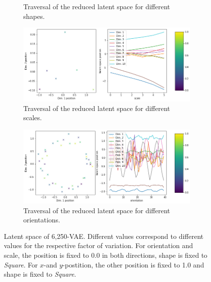 \begin{figure}[H]
\begin{subfigure}{.48\textwidth}
        \caption{Traversal of the reduced latent space for different shapes.}
    \end{subfigure}
    \begin{subfigure}{.48\textwidth}
        \includegraphics[width=\textwidth]{images/latent_space_traversals/vae_6250_dsprites_latent_space_values_scale.png}
        \caption{Traversal of the reduced latent space for different scales.}
    \end{subfigure}
    \begin{subfigure}{.48\textwidth}
        \includegraphics[width=\textwidth]{images/latent_space_traversals/vae_6250_dsprites_latent_space_values_orientation.png}
        \caption{Traversal of the reduced latent space for different orientations.}
    \end{subfigure}
    \caption[6,250-VAE - Latent Space Values]{Latent space of 6,250-\ac{VAE}. Different values correspond to different values for the respective factor of variation. For orientation and scale, the position is fixed to 0.0 in both directions, shape is fixed to \textit{Square}. For $x$-and $y$-postition, the other position is fixed to 1.0 and shape is fixed to \textit{Square}.}
    \label{fig:vae_dsprite_6250_latent_space_position}
\end{figure}

